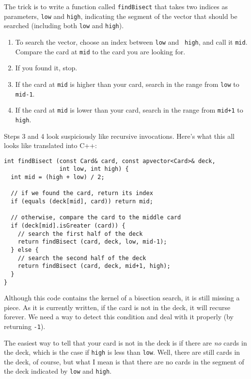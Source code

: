 
The trick is to write a function called {\tt findBisect} that takes
two indices as parameters, {\tt low} and {\tt high}, indicating the
segment of the vector that should be searched (including both
{\tt low} and {\tt high}).

\begin{enumerate}

\item To search the vector, choose an index between {\tt low} and {\tt
high}, and call it {\tt mid}.  Compare the card at {\tt mid} to the
card you are looking for.

\item If you found it, stop.

\item If the card at {\tt mid} is higher than your card, search
in the range from {\tt low} to {\tt mid-1}.

\item If the card at {\tt mid} is lower than your card, search
in the range from {\tt mid+1} to {\tt high}.

\end{enumerate}
%
Steps 3 and 4 look suspiciously like recursive
invocations.  Here's what this all looks like translated into
C++:

\begin{verbatim}
int findBisect (const Card& card, const apvector<Card>& deck,
                int low, int high) {
  int mid = (high + low) / 2;

  // if we found the card, return its index
  if (equals (deck[mid], card)) return mid;

  // otherwise, compare the card to the middle card
  if (deck[mid].isGreater (card)) {
    // search the first half of the deck
    return findBisect (card, deck, low, mid-1);
  } else {
    // search the second half of the deck
    return findBisect (card, deck, mid+1, high);
  }
}
\end{verbatim}
%
Although this code contains the kernel of a bisection search, it
is still missing a piece.  As it is currently written,
if the card is not in the deck, it will recurse forever.  We
need a way to detect this condition and deal with it properly
(by returning {\tt -1}).


The easiest way to tell that your card is not in the deck
is if there are {\em no} cards in the deck, which is the
case if {\tt high} is less than {\tt low}.  Well, there are
still cards in the deck, of course, but what I mean is that
there are no cards in the segment of the deck indicated by
{\tt low} and {\tt high}.

